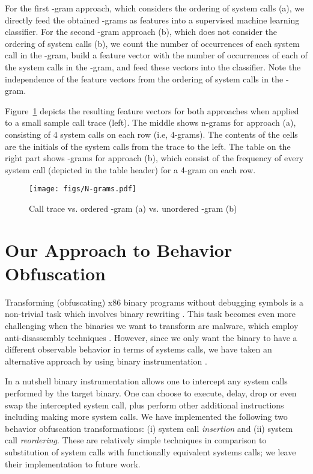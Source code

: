 \documentclass{llncs}
\begin{document}
For the first -gram approach, which considers the ordering of system calls (a), we directly feed the obtained -grams as features into a supervised machine learning classifier. 
For the second -gram approach (b), which does not consider the ordering of system calls (b), we count the number of occurrences of each system call in the -gram, build a feature vector with the number of occurrences of each of the system calls in the -gram, and feed these vectors into the classifier.
Note the independence of the feature vectors from the ordering of system calls in the -gram. 


Figure~\ref{fig:ngram} depicts the resulting feature vectors for both approaches when applied to a small sample call trace (left). The middle shows n-grams for approach (a), consisting of 4 system calls on each row (i.e, 4-grams). The contents of the cells are the initials of the system calls from the trace to the left. The table on the right part shows -grams for approach (b), which consist of the frequency of every system call (depicted in the table header) for a 4-gram on each row. 

\begin{figure}[t]
\begin{center}
	\vspace{-1em}
		\texttt{[image: figs/N-grams.pdf]}\vspace{-0.5em}
	\caption{Call trace vs. ordered -gram (a) vs. unordered -gram (b)} \vspace{-2em}
	\label{fig:ngram}
\end{center}
\end{figure} 
 
\section{Our Approach to Behavior Obfuscation}
\label{sec:approach}

Transforming (obfuscating) x86 binary programs without debugging symbols is a non-trivial task which involves binary rewriting \cite{prasad2003binary}. This task becomes even more challenging when the binaries we want to transform are malware, which employ anti-disassembly techniques \cite{eagle2011ida}. However, since we only want the binary to have a different observable behavior in terms of systems calls, we have taken an alternative approach by using binary instrumentation \cite{reddi2004pin}.

In a nutshell binary instrumentation allows one to intercept any system calls performed by the target binary. One can choose to execute, delay, drop or even swap the intercepted system call, plus perform other additional instructions including making more system calls. 
We have implemented the following two behavior obfuscation transformations: (i) system call \emph{insertion} and (ii) system call \emph{reordering}. These are relatively simple techniques in comparison to substitution of system calls with functionally equivalent systems calls; we leave their implementation to future work. 
\end{document}
